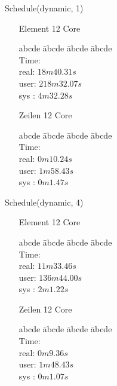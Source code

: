 \documentclass[11pt]{article}
\begin{document}
{{Schedule(dynamic, 1)\\
\begin{enumerate}[leftmargin=4cm]
\item[Element 12 Core]
\begin{tabbing}
abcde \= abcde \= abcde \= abcde \kill
\\Time:\\
\>real: $18m40.31s$ \\
\>user: $218m32.07s$ \\
\>sys : $4m32.28s$ \\
\end{tabbing}
\item[Zeilen 12 Core]
\begin{tabbing}
abcde \= abcde \= abcde \= abcde \kill
\\Time:\\
\>real: $0m10.24s$ \\
\>user: $1m58.43s$ \\
\>sys : $0m1.47s$
\end{tabbing}
\end{enumerate}

Schedule(dynamic, 4)\\
\begin{enumerate}[leftmargin=4cm]
\item[Element 12 Core]
\begin{tabbing}
abcde \= abcde \= abcde \= abcde \kill
\\Time:\\
\>real: $11m33.46s$ \\
\>user: $136m44.00s$ \\
\>sys : $2m1.22s$ \\
\end{tabbing}
\item[Zeilen 12 Core]
\begin{tabbing}
abcde \= abcde \= abcde \= abcde \kill
\\Time:\\
\>real: $0m9.36s$ \\
\>user: $1m48.43s$ \\
\>sys : $0m1.07s$
\end{tabbing}
\end{enumerate}

}}
\end{document}
